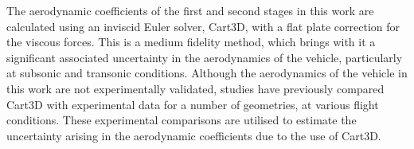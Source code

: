 




The aerodynamic coefficients of the first and second stages in this work are calculated using an inviscid Euler solver, Cart3D, with a flat plate correction for the viscous forces. This is a medium fidelity method, which brings with it a significant associated uncertainty in the aerodynamics of the vehicle, particularly at subsonic and transonic conditions. Although the aerodynamics of the vehicle in this work are not experimentally validated, studies have previously compared Cart3D with experimental data for a number of geometries, at various flight conditions. These experimental comparisons are  utilised to estimate the uncertainty arising in the aerodynamic coefficients due to the use of Cart3D.

